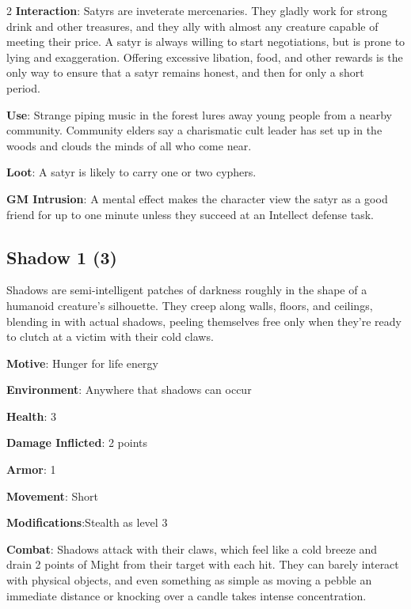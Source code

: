 \begin{multicols}{2}
\textbf{Interaction}: Satyrs are inveterate mercenaries. They gladly work for strong drink and other treasures, and they ally with almost any creature capable of meeting their price. A satyr is always willing to start negotiations, but is prone to lying and exaggeration. Offering excessive libation, food, and other rewards is the only way to ensure that a satyr remains honest, and then for only a short period. 

\textbf{Use}: Strange piping music in the forest lures away young people from a nearby community. Community elders say a charismatic cult leader has set up in the woods and clouds the minds of all who come near. 

\textbf{Loot}: A satyr is likely to carry one or two cyphers.

\textbf{GM Intrusion}: A mental effect makes the character view the satyr as a good friend for up to one minute unless they succeed at an Intellect defense task.

\subsection{Shadow 1 (3)}

Shadows are semi-intelligent patches of darkness roughly in the shape of a humanoid creature’s silhouette. They creep along walls, floors, and ceilings, blending in with actual shadows, peeling themselves free only when they’re ready to clutch at a victim with their cold claws. 

\textbf{Motive}: Hunger for life energy 

\textbf{Environment}: Anywhere that shadows can occur 

\textbf{Health}: 3 

\textbf{Damage Inflicted}: 2 points 

\textbf{Armor}: 1 

\textbf{Movement}: Short 

\textbf{Modifications}:Stealth as level 3 

\textbf{Combat}: Shadows attack with their claws, which feel like a cold breeze and drain 2 points of Might from their target with each hit. They can barely interact with physical objects, and even something as simple as moving a pebble an immediate distance or knocking over a candle takes intense concentration. 


\end{multicols}
